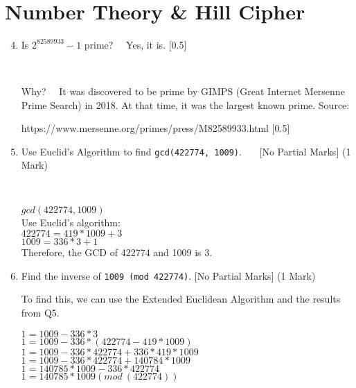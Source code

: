 \documentclass[12pt,emtex]{article}
\begin{document}
\newpage

\

\vspace{-20mm}

    
    \section{Number Theory \& Hill Cipher}
    
    \vspace{2mm}
    \begin{enumerate}
    
        \setcounter{enumi}{3}
        
\item Is $2^{82589933}-1$ prime?   \ \  Yes, it is. \hfill [0.5]

\

Why? \ \ It was discovered to be prime by GIMPS (Great Internet Mersenne Prime Search) in 2018. At that time, it was the largest known prime. Source: 

https://www.mersenne.org/primes/press/M82589933.html \hfill [0.5]

\item Use Euclid's Algorithm to find \texttt{gcd(422774, 1009)}.
\ \ \ 
       [No Partial Marks] \hfill  (1 Mark)
       
       \

      $gcd(422774, 1009)$ \\
      Use Euclid's algorithm: \\ 
      $422774 = 419 * 1009 + 3$ \\
      $1009 = 336 * 3 + 1$ \\

      Therefore, the GCD of 422774 and 1009 is 3.






  


    \item Find the inverse of \texttt{1009 (mod 422774)}. [No Partial Marks] \hfill     (1 Mark)
    
    To find this, we can use the Extended Euclidean Algorithm and the results from Q5.
    
    $1 = 1009 - 336 * 3$ \\
    $1 = 1009 - 336 * (422774 - 419 * 1009)$ \\
    $1 = 1009 - 336 * 422774 +  336 * 419 * 1009$ \\
    $1 = 1009 - 336 * 422774 +  140784 * 1009$ \\
    $1 = 140785 * 1009 - 336 * 422774$ \\
    $1 = 140785 * 1009 (mod\ (422774))$ \\


\end{enumerate}
\end{document}
